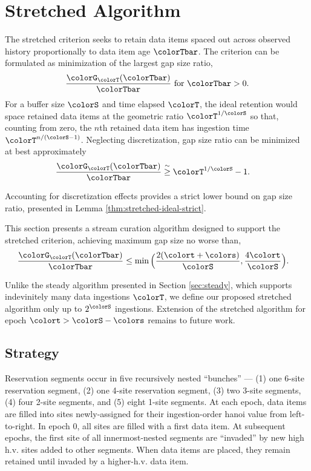 \section{Stretched Algorithm} \label{sec:stretched}

The stretched criterion seeks to retain data items spaced out across observed history proportionally to data item age $\colorTbar$.
The criterion can be formulated as minimization of the largest gap size ratio,
\begin{align*}
\frac{\colorG_{\colorT}(\colorTbar)}{\colorTbar} \text{ for } \colorTbar > 0.
\end{align*}
For a buffer size $\colorS$ and time elapsed $\colorT$, the ideal retention would space retained data items at the geometric ratio $\colorT^{1/\colorS}$ so that, counting from zero, the $n$th retained data item has ingestion time $\colorT^{n/(\colorS - 1)}$.
Neglecting discretization, gap size ratio can be minimized at best approximately
\begin{align*}
\frac{\colorG_{\colorT}(\colorTbar)}{\colorTbar}
&\stackrel{\sim}{\geq}
\colorT^{1/\colorS} - 1.
\end{align*}

Accounting for discretization effects provides a strict lower bound on gap size ratio, presented in Lemma \ref{thm:stretched-ideal-strict}.



This section presents a stream curation algorithm designed to support the stretched criterion, achieving maximum gap size no worse than,
\begin{align*}
\frac{\colorG_{\colorT}(\colorTbar)}{\colorTbar}
&\leq
\min\Big(
  \frac{2(\colort + \colors)}{\colorS},
  \frac{4\colort}{\colorS}
\Big).
\end{align*}

Unlike the steady algorithm presented in Section \ref{sec:steady}, which supports indevinitely many data ingestions $\colorT$, we define our proposed stretched algorithm only up to $2^{\colorS}$ ingestions.
Extension of the stretched algorithm for epoch $\colort > \colorS - \colors$ remains to future work.

\subsection{Strategy}



Reservation segments occur in five recursively nested ``bunches'' --- (1) one 6-site reservation segment, (2) one 4-site reservation segment, (3) two 3-site segments, (4) four 2-site segments, and (5) eight 1-site segments.
At each epoch, data items are filled into sites newly-assigned for their ingestion-order hanoi value from left-to-right.
In epoch 0, all sites are filled with a first data item.
At subsequent epochs, the first site of all innermost-nested segments are ``invaded'' by new high h.v. sites added to other segments.
When data items are placed, they remain retained until invaded by a higher-h.v. data item.

